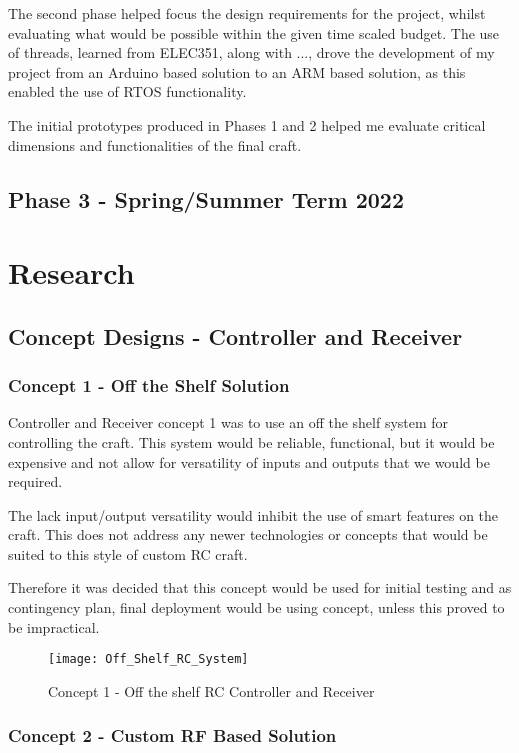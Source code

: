 \documentclass [11pt]{article}
\begin{document}
The second phase helped focus the design requirements for the project, whilst evaluating what would be possible within the given time scaled budget. The use of threads, learned from ELEC351, along with ..., drove the development of my project from an Arduino based solution to an ARM based solution, as this enabled the use of RTOS functionality. 

The initial prototypes produced in Phases 1 and 2 helped me evaluate critical dimensions and functionalities of the final craft.

\subsection{Phase 3 - Spring/Summer Term 2022} 

\section{Research}

\subsection{Concept Designs - Controller and Receiver}
\subsubsection{Concept 1 - Off the Shelf Solution}
Controller and Receiver concept 1 was to use an off the shelf system for controlling the craft. This system would be reliable, functional, but it would be expensive and not allow for versatility of inputs and outputs that we would be required. 

The lack input/output versatility would inhibit the use of smart features on the craft. This does not address any newer technologies or concepts that would be suited to this style of custom RC craft. 

Therefore it was decided that this concept would be used for initial testing and as contingency plan, final deployment would be using concept, unless this proved to be impractical. 

\begin{figure}[H]
\centerline{\texttt{[image: Off\_Shelf\_RC\_System]}}
\caption{Concept 1 - Off the shelf RC Controller and Receiver}
\label{fig:Custom_RC_System}
\end{figure} 


\subsubsection{Concept 2 - Custom RF Based Solution}
\end{document}
